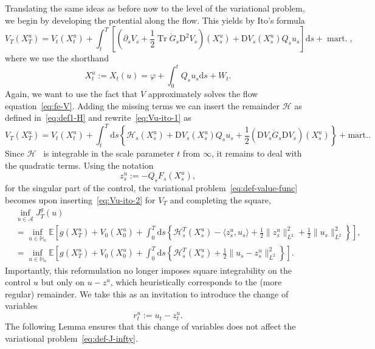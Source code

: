 \documentclass[11pt, a4paper]{scrartcl}
\numberwithin{equation}{section}
\theoremstyle{plain}
\theoremstyle{remark}
\newcommand{\assign}{:=}
\newcommand{\mathD}{\mathrm{D}}
\newcommand{\mathd}{\mathrm{d}}
\newcommand{\tmop}[1]{\ensuremath{\operatorname{#1}}}
\begin{document}
Translating the same ideas as before now to the level of the variational
problem, we begin by developing the potential along the flow. This yields by
Ito's formula
\begin{equation}
  V_T (X_T^u) = V_t (X_t^u) + \int_t^T \left[ \left( \partial_s V_s +
  \frac{1}{2} \tmop{Tr} \dot{G}_s \mathD^2 V_s \right) (X_s^u) + \mathD V_s
  (X^u_s) Q_s u_s \right] \mathd s + \tmop{mart.}, \label{eq:Vu-ito-1}
\end{equation}
where we use the shorthand
\[ X_t^u \assign X_t (u) = \varphi + \int_0^t Q_s
   u_s \mathd s + W_t . \]
Again, we want to use the fact that $V$ approximately solves the flow
equation~\eqref{eq:fe-V}. Adding the missing terms we can insert the remainder
$\mathcal{H}$ as defined in~\eqref{eq:def1-H} and rewrite~\eqref{eq:Vu-ito-1}
as
\begin{equation}
  V_T (X_T^u) = V_t (X_t^u) + \int_t^T \mathd s \left\{ \mathcal{H}_s (X_s^u)
  + \mathD V_s (X^u_s) Q_s u_s + \frac{1}{2} (\mathD V_s  \dot{G}_s \mathD
  V_s) (X_s^u) \right\} + \text{mart.} \label{eq:Vu-ito-2} .
\end{equation}
Since $\mathcal{H}$ \ is integrable in the scale parameter $t$ from $\infty$,
it remains to deal with the quadratic terms. Using the notation
\[ z^u_s \assign - Q_s F_s (X^u_s), \]
for the singular part of the control, the variational
problem~\eqref{eq:def-value-func} becomes upon inserting~\eqref{eq:Vu-ito-2}
for $V_T$ and completing the square,
\begin{equation}
  \begin{aligned}
    & \inf_{u \in \mathcal{A}} J_T^g (u) \\ &= \inf_{u \in \mathbb{H}_a}
    \mathbb{E} \left[ g (X_T^u) + V_0 (X_0^u) + \int_0^T \mathd s \left\{
    \mathcal{H}^T_s \left( X_s^u \right) - \langle z_s^u, u_s \rangle +
    \frac{1}{2} \| z^u_s \|_{L^2}^2 + \frac{1}{2} \| u_s \|^2_{L^2} \right\}
    \right],\\
    &= \inf_{u \in \mathbb{H}_a} \mathbb{E} \left[ g (X_T^u) + V_0 (X_0^u)
    + \int_0^T \mathd s \left\{ \mathcal{H}^T_s (X_s^u) + \frac{1}{2} \| u_s -
    z^u_s \|^2_{L^2} \right\} \right] .
  \end{aligned} \label{eq:def-J-infty}
\end{equation}
Importantly, this reformulation no longer imposes square integrability on the
control $u$ but only on $u - z^u$, which heuristically corresponds to the
(more regular) remainder. We take this as an invitation to introduce the
change of variables
\begin{equation}
  r_t^u \assign u_t - z^u_t . \label{eq:def-ru}
\end{equation}
The following Lemma ensures that this change of variables does not affect the
variational problem~\eqref{eq:def-J-infty}.
\end{document}

